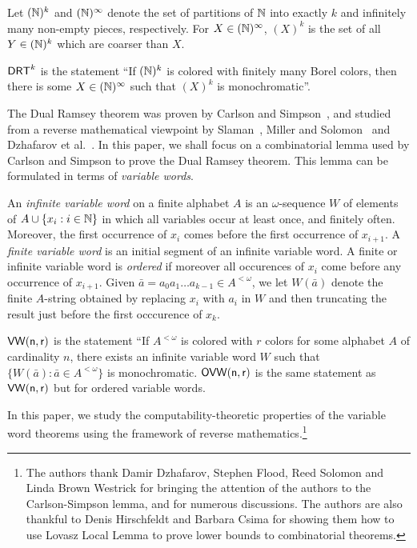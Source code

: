 
Let $(\mathbb{N})^k$ and $(\mathbb{N})^\infty$ denote the set of partitions of $\mathbb{N}$ into exactly $k$ and infinitely many non-empty pieces, respectively. For $X \in (\mathbb{N})^\infty$, $(X)^k$ is the set of all $Y \in (\mathbb{N})^k$ which are coarser than $X$.

\begin{statement}
	$\operatorname{\sf{DRT}}^k$ is the statement ``If $(\mathbb{N})^k$ is colored with finitely many Borel colors, then there is some $X \in (\mathbb{N})^\infty$ such that $(X)^k$ is monochromatic''.
\end{statement}

The Dual Ramsey theorem was proven by Carlson and Simpson~\cite{Carlson1984dual},
and studied from a reverse mathematical viewpoint by Slaman~\cite{Slaman1997note}, Miller and Solomon~\cite{Miller2004Effectiveness} and Dzhafarov et al.~\cite{Dzhafarov2017Effectiveness}.
In this paper, we shall focus on a combinatorial lemma used by Carlson and Simpson to prove the Dual Ramsey theorem. This lemma can be formulated in terms of \emph{variable words}.

\begin{definition}
An \emph{infinite variable word} on a finite alphabet $A$
is an $\omega$-sequence $W$ of elements of $A \cup \{x_i : i \in \mathbb{N}\}$
in which all variables occur at least once, and finitely often. Moreover, the first occurrence of $x_i$ comes before the first occurrence of $x_{i+1}$.
A \emph{finite variable word} is an initial segment of an infinite variable word. A finite or infinite variable word is \emph{ordered} if moreover all occurences of $x_i$ come before any occurrence of $x_{i+1}$.
Given $\bar a = a_0a_1 \dots a_{k-1} \in A^{<\omega}$, we let $W(\bar a)$
denote the finite $A$-string obtained by replacing $x_i$ with $a_i$ in $W$ and then truncating the result
just before the first occcurence of $x_k$.
\end{definition}

\begin{statement}
$\sf{VW}(n,r)$ is the statement ``If $A^{<\omega}$ is colored with $r$ colors for some alphabet $A$
of cardinality $n$, there exists
an infinite variable word $W$ such that $\{W(\bar a) : \bar a \in A^{<\omega}\}$ is monochromatic.
$\sf{OVW}(n,r)$ is the same statement as $\sf{VW}(n,r)$ but for ordered variable words.
\end{statement}

In this paper, we study the computability-theoretic properties of the variable word theorems using the framework of reverse mathematics.\footnote{The authors thank Damir Dzhafarov, Stephen Flood, Reed Solomon and Linda Brown Westrick for bringing the attention of the authors to the Carlson-Simpson lemma, and for  numerous discussions. The authors are also thankful to Denis Hirschfeldt and Barbara Csima for showing them how to use Lovasz Local Lemma to prove lower bounds to combinatorial theorems.}

